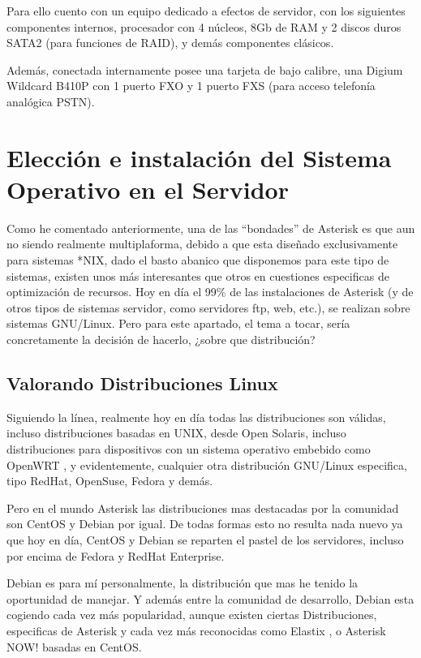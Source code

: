 Para ello cuento con un equipo dedicado a efectos de servidor, con los siguientes componentes internos, procesador con 4 núcleos, 8Gb de RAM y 2 discos duros SATA2 (para funciones de RAID), y demás componentes clásicos.

Además, conectada internamente posee una tarjeta de bajo calibre, una Digium Wildcard B410P con 1 puerto FXO y 1 puerto FXS (para acceso telefonía analógica PSTN).

\section{Elección e instalación del Sistema Operativo en el Servidor}

Como he comentado anteriormente, una de las “bondades” de Asterisk es que aun no siendo realmente multiplaforma, debido a que esta diseñado exclusivamente para sistemas *NIX, dado el basto abanico que disponemos para este tipo de sistemas, existen unos más interesantes que otros en cuestiones especificas de optimización de recursos. Hoy en día el 99\% de las instalaciones de Asterisk (y de otros tipos de sistemas servidor, como servidores ftp, web, etc.), se realizan sobre sistemas GNU/Linux. Pero para este apartado, el tema a tocar, sería concretamente la decisión de hacerlo, ¿sobre que distribución?

\subsection{Valorando Distribuciones Linux}

Siguiendo la línea, realmente hoy en día todas las distribuciones son válidas, incluso distribuciones basadas en UNIX, desde Open Solaris, incluso distribuciones para dispositivos con un sistema operativo embebido como OpenWRT \cite{website:openwrt}, y evidentemente, cualquier otra distribución GNU/Linux especifica, tipo RedHat, OpenSuse, Fedora y demás.

Pero en el mundo Asterisk las distribuciones mas destacadas por la comunidad son CentOS y Debian por igual. De todas formas esto no resulta nada nuevo ya que hoy en día, CentOS y Debian se reparten el pastel de los servidores, incluso por encima de Fedora y RedHat Enterprise.

Debian es para mí personalmente, la distribución que mas he tenido la oportunidad de manejar. Y además entre la comunidad de desarrollo, Debian esta cogiendo cada vez más popularidad, aunque existen ciertas Distribuciones, especificas de Asterisk y cada vez más reconocidas como Elastix \cite{website:elastix}, o Asterisk NOW! \cite{website:asterisknow} basadas en CentOS. 

